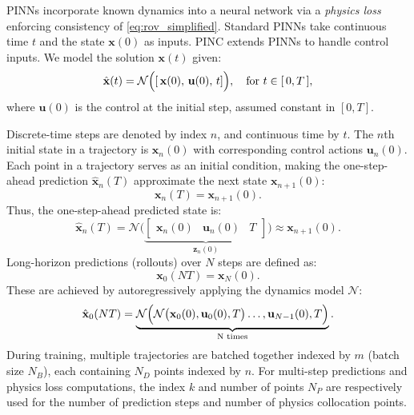 PINNs \cite{raissi_physics-informed_2019} incorporate known dynamics into a neural network via a \emph{physics loss} enforcing consistency of \eqref{eq:rov_simplified}. Standard PINNs take continuous time $t$ and the state $\mathbf{x}(0)$ as inputs. 
PINC \cite{antonelo_physics-informed_2024} extends PINNs to handle control inputs. We model the solution $\mathbf{x}(t)$ given:
\begin{equation}
\hat{\mathbf{x}}(t) = \mathcal{N}\Bigl(\left[\,\mathbf{x}(0),\,\mathbf{u}(0),\,t\right]\Bigr),
\quad \text{for } t\in[\,0,T\,],
\label{eq:pinc_mapping}
\end{equation}
where $\mathbf{u}(0)$ is the control at the initial step, assumed constant in $[0,T]$. %

Discrete-time steps are denoted by index $n$, and continuous time by $t$. The $n$th initial state in a trajectory is $\mathbf{x}_n(0)$ with corresponding control actions $\mathbf{u}_n(0)$. Each point in a trajectory serves as an initial condition, making the one-step-ahead prediction $\hat{\mathbf{x}}_n(T)$ approximate the next state $\mathbf{x}_{n+1}(0)$:
\begin{equation}
    \mathbf{x}_{n}(T) = \mathbf{x}_{n+1}(0).
\end{equation}
Thus, the one-step-ahead predicted state is:
\begin{equation} 
    \hat{\mathbf{x}}_{n}(T) 
    =\mathcal{N}\bigl(\underbrace{\begin{bmatrix}
    \mathbf{x}_n(0) & \mathbf{u}_n(0) & T
\end{bmatrix}}_{\mathbf{z}_n(0)}\bigr)
    \approx\mathbf{x}_{n+1}(0).
\end{equation}
Long-horizon predictions (rollouts) over $N$ steps are defined as:
\begin{equation}
    \mathbf{x}_0(NT)=\mathbf{x}_N(0).
\end{equation}
These are achieved by autoregressively applying the dynamics model $\mathcal{N}$:
\begin{equation}
\label{eq:rollout_prediction}
    \hat{\mathbf{x}}_0(NT) = \underbrace{\mathcal{N} \Bigl( \mathcal{N} \bigl( \mathbf{x}_0(0), \mathbf{u}_0(0), T \bigr)\dots, \mathbf{u}_{N-1}(0), T\Bigr)}_{\text{N times}}.
\end{equation}
During training, multiple trajectories are batched together indexed by $m$ (batch size $N_B$), each containing $N_D$ points indexed by $n$. For multi-step predictions and physics loss computations, the index $k$ and number of points $N_{P}$ are respectively used for the number of prediction steps and number of physics collocation points. 

